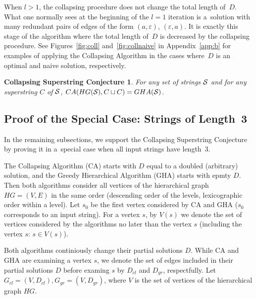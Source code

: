 \documentclass[11pt]{article}
\newcommand{\cld}{D_{cl}}
\newcommand{\grd}{D_{gr}}
\newcommand{\clgraph}{G_{cl}}
\newcommand{\grgraph}{G_{gr}}
\begin{document}
When $l>1$, the collapsing procedure does not change the total length of~$D$. 
What one normally sees at the beginning of the
$l=1$ iteration is a~solution with many 
redundant pairs of edges of the form $(a, \varepsilon)$, $(\varepsilon, a)$. It is exactly this stage of the algorithm where the total length of~$D$ is decreased by the collapsing procedure. See Figures~\ref{fig:coll} and~\ref{fig:collnaive} in Appendix~\ref{app:b} for examples of applying the Collapsing Algorithm in the cases where~$D$ is an optimal and naive solution, respectively.


\newtheorem*{scs}{Collapsing Superstring Conjecture}
\begin{scs}
For any set of strings ${\cal S}$ and for any superstring $C$ of ${\cal S}$, $CA(HG({\cal S}), C \sqcup C) = GHA({\cal S})$.
\end{scs}


\subsection{Proof of the Special Case: Strings of Length~3}\label{subsec:scs3}
In the remaining subsections, we support the Collapsing Superstring Conjecture by proving it in a~special case when all input strings have length~3.

The Collapsing Algorithm (CA) starts with $D$ equal to a doubled (arbitrary) solution, and the Greedy Hierarchical Algorithm (GHA) starts with epmty $D$. Then both algorithms consider all vertices of the hierarchical graph $HG=(V, E)$ in the same order (descending order of the levels, lexicographic order within a level). Let $s_0$ be the first vertex considered by CA and GHA ($s_0$ corresponds to an input string). For a vertex $s$, by $V(s)$ we denote the set of vertices considered by the algorithms no later than the vertex $s$ (including the vertex $s$: $s\in V(s)$).

Both algorithms continiously change their partial solutions $D$. While CA and GHA are examining a vertex $s$, we denote the set of edges included in their partial solutions $D$ before examing $s$ by $\cld{}$ and $\grd{}$, respectfully. Let $\clgraph = (V, \cld), \grgraph = (V, \grd)$, where $V$ is the set of vertices of the hierarchical graph $HG$. 
\end{document}
